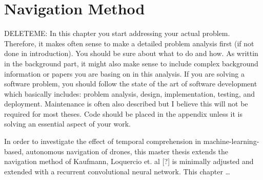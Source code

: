 \chapter{Navigation Method}
\label{mainone}
DELETEME: In this chapter you start addressing your actual problem. Therefore, it makes often sense to make a detailed problem analysis first (if not done in introduction). You should be sure about what to do and how. As writtin in the background part, it might also make sense to include complex background information or papers you are basing on in this analysis. If you are solving a software problem, you should follow the state of the art of software development which basically includes: problem analysis, design, implementation, testing, and deployment. Maintenance is often also described but I believe this will not be required for most theses. Code should be placed in the appendix unless it is solving an essential aspect of your work.






In order to investigate the effect of temporal comprehension in machine-learning-based, autonomous navigation of drones,
this master thesis extends the navigation method of Kaufmann, Loquercio et. al [?] is minimally adjusted and extended with a recurrent convolutional neural network.
This chapter \dots



